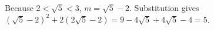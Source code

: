 Because $2<\sqrt5<3$, $m=\sqrt5-2$. Substitution gives $(\sqrt5-2)^2+2(2\sqrt5-2)=9-4\sqrt5+4\sqrt5-4=\boxed5$.
